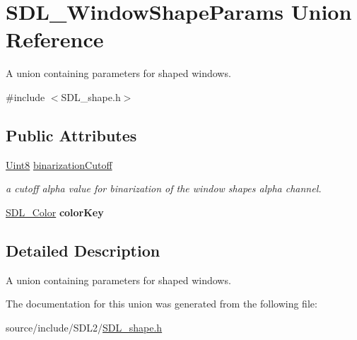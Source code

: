 \hypertarget{union_s_d_l___window_shape_params}{}\section{S\+D\+L\+\_\+\+Window\+Shape\+Params Union Reference}
\label{union_s_d_l___window_shape_params}


A union containing parameters for shaped windows.  




{\ttfamily \#include $<$S\+D\+L\+\_\+shape.\+h$>$}

\subsection*{Public Attributes}
\begin{DoxyCompactItemize}
\item 
\hypertarget{union_s_d_l___window_shape_params_a534c40b09588a8075c0a70227753dc56}{}\hyperlink{_s_d_l__stdinc_8h_a2944638813a090aa23e62f4da842c3e2}{Uint8} \hyperlink{union_s_d_l___window_shape_params_a534c40b09588a8075c0a70227753dc56}{binarization\+Cutoff}\label{union_s_d_l___window_shape_params_a534c40b09588a8075c0a70227753dc56}

\begin{DoxyCompactList}\small\item\em a cutoff alpha value for binarization of the window shape\textquotesingle{}s alpha channel. \end{DoxyCompactList}\item 
\hypertarget{union_s_d_l___window_shape_params_a8bf3e442a51a1bbf452cfec7c1ed5318}{}\hyperlink{struct_s_d_l___color}{S\+D\+L\+\_\+\+Color} {\bfseries color\+Key}\label{union_s_d_l___window_shape_params_a8bf3e442a51a1bbf452cfec7c1ed5318}

\end{DoxyCompactItemize}


\subsection{Detailed Description}
A union containing parameters for shaped windows. 

The documentation for this union was generated from the following file\+:\begin{DoxyCompactItemize}
\item 
source/include/\+S\+D\+L2/\hyperlink{_s_d_l__shape_8h}{S\+D\+L\+\_\+shape.\+h}\end{DoxyCompactItemize}
